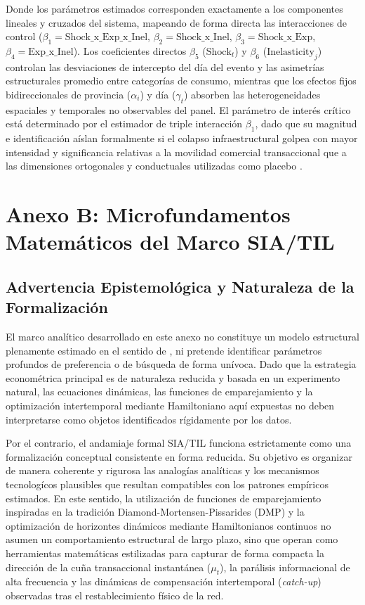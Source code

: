 Donde los par\'ametros estimados corresponden exactamente a los componentes lineales y cruzados del sistema, mapeando de forma directa las interacciones de control ($\beta_1 = \text{Shock\_x\_Exp\_x\_Inel}$, $\beta_2 = \text{Shock\_x\_Inel}$, $\beta_3 = \text{Shock\_x\_Exp}$, $\beta_4 = \text{Exp\_x\_Inel}$). Los coeficientes directos $\beta_5$ ($\text{Shock}_t$) y $\beta_6$ ($\text{Inelasticity}_j$) controlan las desviaciones de intercepto del d\'ia del evento y las asimetr\'ias estructurales promedio entre categor\'ias de consumo, mientras que los efectos fijos bidireccionales de provincia ($\alpha_i$) y d\'ia ($\gamma_t$) absorben las heterogeneidades espaciales y temporales no observables del panel. El par\'ametro de inter\'es cr\'itico est\'a determinado por el estimador de triple interacci\'on $\beta_1$, dado que su magnitud e identificaci\'on a\'islan formalmente si el colapso infraestructural golpea con mayor intensidad y significancia relativas a la movilidad comercial transaccional que a las dimensiones ortogonales y conductuales utilizadas como placebo \citep{angrist2009mostly}.

\newpage
\section{Anexo B: Microfundamentos Matem\'aticos del Marco SIA/TIL}
\label{anx:anexo_b}

\subsection{Advertencia Epistemol\'ogica y Naturaleza de la Formalizaci\'on}\label{sec:B_1}

El marco anal\'itico desarrollado en este anexo no constituye un modelo estructural plenamente estimado en el sentido de \citet{heckman1989choosing}, ni pretende identificar par\'ametros profundos de preferencia o de b\'usqueda de forma un\'ivoca. Dado que la estrategia econom\'etrica principal es de naturaleza reducida y basada en un experimento natural, las ecuaciones din\'amicas, las funciones de emparejamiento y la optimizaci\'on intertemporal mediante Hamiltoniano aqu\'i expuestas no deben interpretarse como objetos identificados r\'igidamente por los datos.

Por el contrario, el andamiaje formal SIA/TIL funciona estrictamente como una formalizaci\'on conceptual consistente en forma reducida. Su objetivo es organizar de manera coherente y rigurosa las analog\'ias anal\'iticas y los mecanismos tecnolog\'icos plausibles que resultan compatibles con los patrones emp\'iricos estimados. En este sentido, la utilizaci\'on de funciones de emparejamiento inspiradas en la tradici\'on Diamond-Mortensen-Pissarides (DMP) y la optimizaci\'on de horizontes din\'amicos mediante Hamiltonianos continuos no asumen un comportamiento estructural de largo plazo, sino que operan como herramientas matem\'aticas estilizadas para capturar de forma compacta la direcci\'on de la cu\~na transaccional instant\'anea ($\mu_t$), la par\'alisis informacional de alta frecuencia y las din\'amicas de compensaci\'on intertemporal (\textit{catch-up}) observadas tras el restablecimiento f\'isico de la red.

